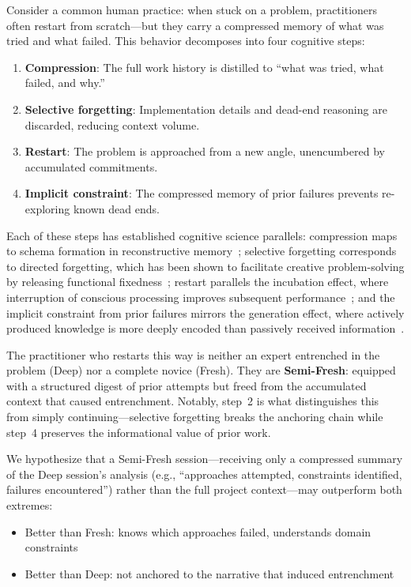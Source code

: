 \documentclass[11pt]{article}
\begin{document}
Consider a common human practice: when stuck on a problem, practitioners often restart from scratch---but they carry a compressed memory of what was tried and what failed. This behavior decomposes into four cognitive steps:

\begin{enumerate}[label=\arabic*., leftmargin=1.5em]
  \item \textbf{Compression}: The full work history is distilled to ``what was tried, what failed, and why.''
  \item \textbf{Selective forgetting}: Implementation details and dead-end reasoning are discarded, reducing context volume.
  \item \textbf{Restart}: The problem is approached from a new angle, unencumbered by accumulated commitments.
  \item \textbf{Implicit constraint}: The compressed memory of prior failures prevents re-exploring known dead ends.
\end{enumerate}

Each of these steps has established cognitive science parallels: compression maps to schema formation in reconstructive memory~\citep{bartlett1932remembering}; selective forgetting corresponds to directed forgetting, which has been shown to facilitate creative problem-solving by releasing functional fixedness~\citep{storm2012forgetting}; restart parallels the incubation effect, where interruption of conscious processing improves subsequent performance~\citep{sio2009incubation}; and the implicit constraint from prior failures mirrors the generation effect, where actively produced knowledge is more deeply encoded than passively received information~\citep{slamecka1978generation}.

The practitioner who restarts this way is neither an expert entrenched in the problem (Deep) nor a complete novice (Fresh). They are \textbf{Semi-Fresh}: equipped with a structured digest of prior attempts but freed from the accumulated context that caused entrenchment. Notably, step~2 is what distinguishes this from simply continuing---selective forgetting breaks the anchoring chain while step~4 preserves the informational value of prior work.

We hypothesize that a Semi-Fresh session---receiving only a compressed summary of the Deep session's analysis (e.g., ``approaches attempted, constraints identified, failures encountered'') rather than the full project context---may outperform both extremes:

\begin{itemize}[leftmargin=1.5em]
  \item Better than Fresh: knows which approaches failed, understands domain constraints
  \item Better than Deep: not anchored to the narrative that induced entrenchment
\end{itemize}
\end{document}
